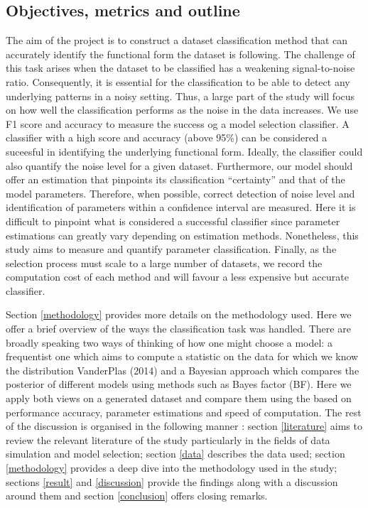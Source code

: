 \documentclass[12pt,]{article}
\begin{document}
\hypertarget{objectives-metrics-and-outline}{%
\subsection{Objectives, metrics and outline}\label{objectives-metrics-and-outline}}

The aim of the project is to construct a dataset classification method that can accurately identify the functional form the dataset is following. The challenge of this task arises when the dataset to be classified has a weakening signal-to-noise ratio. Consequently, it is essential for the classification to be able to detect any underlying patterns in a noisy setting. Thus, a large part of the study will focus on how well the classification performs as the noise in the data increases. We use F1 score and accuracy to measure the success og a model selection classifier. A classifier with a high score and accuracy (above 95\%) can be considered a suceesful in identifying the underlying functional form. Ideally, the classifier could also quantify the noise level for a given dataset. Furthermore, our model should offer an estimation that pinpoints its classification ``certainty'' and that of the model parameters. Therefore, when possible, correct detection of noise level and identification of parameters within a confidence interval are measured. Here it is difficult to pinpoint what is considered a successful classifier since parameter estimations can greatly vary depending on estimation methods. Nonetheless, this study aims to measure and quantify parameter classification. Finally, as the selection process must scale to a large number of datasets, we record the computation cost of each method and will favour a less expensive but accurate classifier.

Section \ref{methodology} provides more details on the methodology used. Here we offer a brief overview of the ways the classification task was handled.
There are broadly speaking two ways of thinking of how one might choose a model: a frequentist one which aims to compute a statistic on the data for which we know the distribution VanderPlas (2014) and a Bayesian approach which compares the posterior of different models using methods such as Bayes factor (BF). Here we apply both views on a generated dataset and compare them using the based on performance accuracy, parameter estimations and speed of computation. The rest of the discussion is organised in the following manner : section \ref{literature} aims to review the relevant literature of the study particularly in the fields of data simulation and model selection; section \ref{data} describes the data used; section \ref{methodology} provides a deep dive into the methodology used in the study; sections \ref{result} and \ref{discussion} provide the findings along with a discussion around them and section \ref{conclusion} offers closing remarks.
\end{document}
